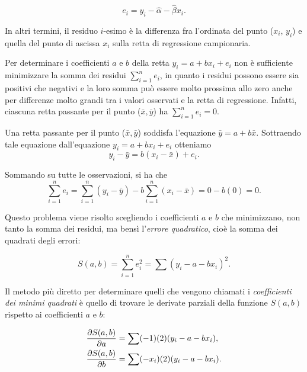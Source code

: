 \documentclass[
]{memoir}
\begin{document}
\begin{equation}
e_i = y_i - \hat{\alpha} - \hat{\beta} x_i.
\label{eq:residuals}
\end{equation}

\noindent
In altri termini, il residuo \(i\)-esimo è la differenza fra l'ordinata del punto (\(x_i\), \(y_i\)) e quella del punto di ascissa \(x_i\) sulla retta di regressione campionaria.

\noindent
Per determinare i coefficienti \(a\) e \(b\) della retta \(y_i = a + b x_i + e_i\) non è sufficiente minimizzare la somma dei residui \(\sum_{i=1}^{n}e_i\), in quanto i residui possono essere sia positivi che negativi e la loro somma può essere molto prossima allo zero anche per differenze molto grandi tra i valori osservati e la retta di regressione. Infatti, ciascuna retta passante per il punto (\(\bar{x}, \bar{y}\)) ha \(\sum_{i=1}^{n}e_i=0\).

Una retta passante per il punto (\(\bar{x}, \bar{y}\)) soddisfa l'equazione \(\bar{y} = a + b \bar{x}\).
Sottraendo tale equazione dall'equazione \(y_i = a + b x_i + e_i\) otteniamo
\[
y_i - \bar{y} =  b (x_i - \bar{x}) + e_i. 
\]

Sommando su tutte le osservazioni, si ha che
\begin{equation}
\sum_{i=1}^n e_i = \sum_{i=1}^n (y_i - \bar{y} ) -  b \sum_{i=1}^n (x_i - \bar{x}) = 0 - b(0) = 0. 
\label{eq:res-sum-zero}
\end{equation}

\noindent
Questo problema viene risolto scegliendo i coefficienti \(a\) e \(b\) che minimizzano, non tanto la somma dei residui, ma bensì l'\emph{errore quadratico}, cioè la somma dei quadrati degli errori:

\begin{equation}
S(a, b) = \sum_{i=1}^{n} e_i^2 = \sum (y_i - a - b x_i)^2.
\end{equation}

\noindent
Il metodo più diretto per determinare quelli che vengono chiamati i \emph{coefficienti dei minimi quadrati} è quello di trovare le derivate parziali della funzione \(S(a, b)\) rispetto ai coefficienti \(a\) e \(b\):

\begin{align}
\frac{\partial S(a,b)}{\partial a} &= \sum (-1)(2)(y_i - a - b x_i), \notag \\
\frac{\partial S(a,b)}{\partial b} &= \sum (-x_i)(2)(y_i - a - b x_i).
\end{align}
\end{document}

